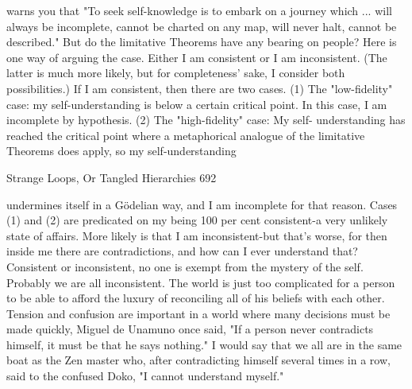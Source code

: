 warns you that "To seek self-knowledge is to embark on a journey which ... will always
be incomplete, cannot be charted on any map, will never halt, cannot be described."
But do the limitative Theorems have any bearing on people? Here is one way of arguing
the case. Either I am consistent or I am inconsistent. (The latter is much more likely, but
for completeness' sake, I consider both possibilities.) If I am consistent, then there are
two cases. (1) The "low-fidelity" case: my self-understanding is below a certain critical
point. In this case, I am incomplete by hypothesis. (2) The "high-fidelity" case: My self-
understanding has reached the critical point where a metaphorical analogue of the
limitative Theorems does apply, so my self-understanding




Strange Loops, Or Tangled Hierarchies                                                     692

undermines itself in a Gödelian way, and I am incomplete for that reason. Cases (1) and
(2) are predicated on my being 100 per cent consistent-a very unlikely state of affairs.
More likely is that I am inconsistent-but that's worse, for then inside me there are
contradictions, and how can I ever understand that?
        Consistent or inconsistent, no one is exempt from the mystery of the self.
Probably we are all inconsistent. The world is just too complicated for a person to be able
to afford the luxury of reconciling all of his beliefs with each other. Tension and
confusion are important in a world where many decisions must be made quickly, Miguel
de Unamuno once said, "If a person never contradicts himself, it must be that he says
nothing." I would say that we all are in the same boat as the Zen master who, after
contradicting himself several times in a row, said to the confused Doko, "I cannot
understand myself."

